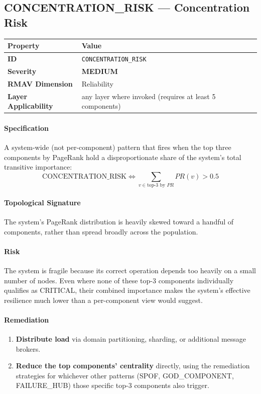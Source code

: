 \documentclass[11pt]{article}
\makeatletter
\newcommand{\MEDIUM}{\textcolor{yellow!50!black}{\textbf{MEDIUM}}}
\newcommand{\patternprop}[4]{%
  \begin{center}
  \begin{tabular}{@{}ll@{}}
  \toprule
  \textbf{Property} & \textbf{Value} \\
  \midrule
  \textbf{ID} & \texttt{#1} \\
  \textbf{Severity} & #2 \\
  \textbf{RMAV Dimension} & #3 \\
  \textbf{Layer Applicability} & #4 \\
  \bottomrule
  \end{tabular}
  \end{center}
}
\makeatother
\begin{document}
\subsection{CONCENTRATION\_RISK --- Concentration Risk}
\patternprop{CONCENTRATION\_RISK}{\MEDIUM}{Reliability}{any layer where invoked (requires at least 5 components)}

\paragraph{Specification}
A system-wide (not per-component) pattern that fires when the top three components by PageRank hold a disproportionate share of the system's total transitive importance:
\[
\mathrm{CONCENTRATION\_RISK} \Leftrightarrow \sum_{v \in \text{top-3 by } PR} PR(v) > 0.5
\]

\paragraph{Topological Signature}
The system's PageRank distribution is heavily skewed toward a handful of components, rather than spread broadly across the population.

\paragraph{Risk}
The system is fragile because its correct operation depends too heavily on a small number of nodes. Even where none of these top-3 components individually qualifies as CRITICAL, their combined importance makes the system's effective resilience much lower than a per-component view would suggest.

\paragraph{Remediation}
\begin{enumerate}[leftmargin=*]
\item \textbf{Distribute load} via domain partitioning, sharding, or additional message brokers.
\item \textbf{Reduce the top components' centrality} directly, using the remediation strategies for whichever other patterns (SPOF, GOD\_COMPONENT, FAILURE\_HUB) those specific top-3 components also trigger.
\end{enumerate}
\end{document}
